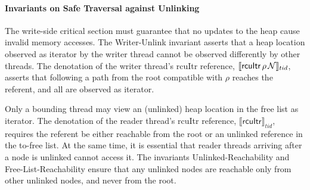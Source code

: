 \paragraph{Invariants on Safe Traversal against Unlinking}
The write-side critical section must guarantee that no updates to the heap cause invalid memory accesses. 
The \textsf{Writer-Unlink} invariant asserts that a heap location observed as \textsf{iterator} by the writer thread cannot be observed differently by other threads. The denotation of the writer thread's \textsf{rcuItr} reference, $\llbracket \mathsf{rcuItr}\,\rho \,\mathcal{N} \rrbracket_{tid}$, asserts that 
following a path from the root compatible with $\rho$ reaches the referent, and all are observed as \textsf{iterator}.

Only a bounding thread may view an (unlinked) heap location in the free list as \textsf{iterator}. The denotation of the reader thread's \textsf{rcuItr} reference, $\llbracket \mathsf{rcuItr} \rrbracket_{tid}$, requires the referent be either reachable from the root or an unlinked reference in the to-free list.
At the same time, it is essential that reader threads arriving after a node is unlinked cannot access it.
The invariants \textsf{Unlinked-Reachability} and \textsf{Free-List-Reachability} ensure that any unlinked nodes are reachable only from other unlinked nodes, and never from the root.
